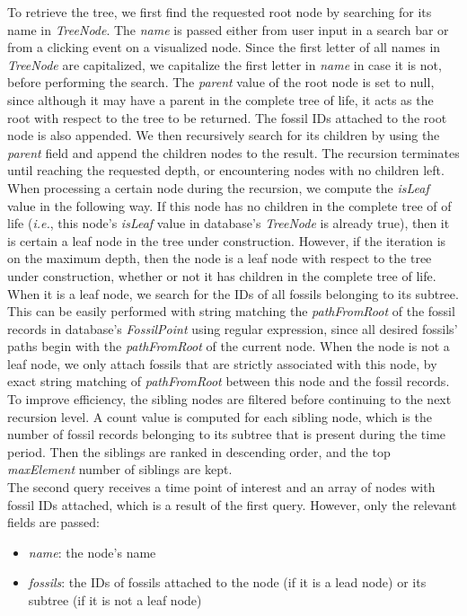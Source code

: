\documentclass[11pt, a4paper,oneside,chapterprefix=false]{scrbook}
\begin{document}
To retrieve the tree, we first find the requested root node by searching for its name in \emph{TreeNode}. The \emph{name} is passed either from user input in a search bar or from a clicking event on a visualized node. Since the first letter of all names in \emph{TreeNode} are capitalized, we capitalize the first letter in \emph{name} in case it is not, before performing the search. The \emph{parent} value of the root node is set to null, since although it may have a parent in the complete tree of life, it acts as the root with respect to the tree to be returned. The fossil IDs attached to the root node is also appended. We then recursively search for its children by using the \emph{parent} field and append the children nodes to the result. The recursion terminates until reaching the requested depth, or encountering nodes with no children left. When processing a certain node during the recursion, we compute the \emph{isLeaf} value in the following way. If this node has no children in the complete tree of of life (\emph{i.e.}, this node's \emph{isLeaf} value in database's \emph{TreeNode} is already true), then it is certain a leaf node in the tree under construction. However, if the iteration is on the maximum depth, then the node is a leaf node with respect to the tree under construction, whether or not it has children in the complete tree of life. When it is a leaf node, we search for the IDs of all fossils belonging to its subtree. This can be easily performed with string matching the \emph{pathFromRoot} of the fossil records in database's \emph{FossilPoint} using regular expression, since all desired fossils' paths begin with the \emph{pathFromRoot} of the current node. When the node is not a leaf node, we only attach fossils that are strictly associated with this node, by exact string matching of \emph{pathFromRoot} between this node and the fossil records. To improve efficiency, the sibling nodes are filtered before continuing to the next recursion level. A count value is computed for each sibling node, which is the number of fossil records belonging to its subtree that is present during the time period. Then the siblings are ranked in descending order, and the top \emph{maxElement} number of siblings are kept. \\

The second query receives a time point of interest and an array of nodes with fossil IDs attached, which is a result of the first query. However, only the relevant fields are passed: 
\begin{itemize}
	\item \textit{name}: the node's name
	\item \textit{fossils}: the IDs of fossils attached to the node (if it is a lead node) or its subtree (if it is not a leaf node)
\end{itemize}
\end{document}
